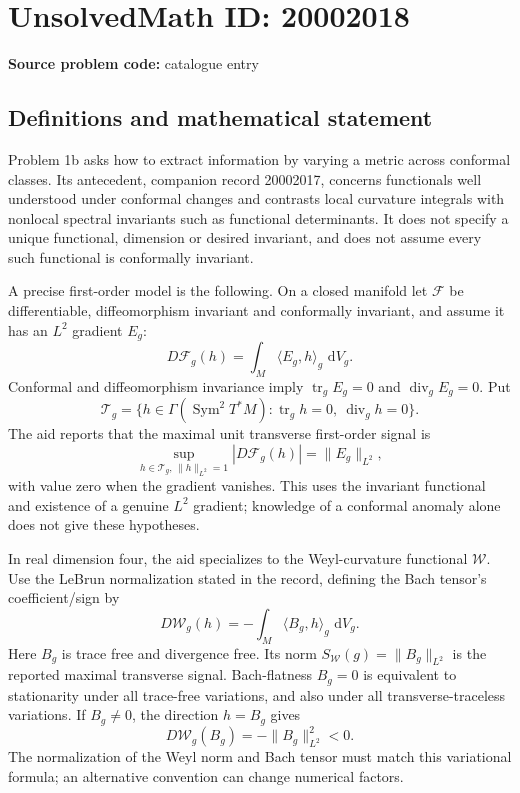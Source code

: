 \documentclass[11pt]{article}
\newcommand{\dd}{\,\mathrm{d}}
\begin{document}
\section*{UnsolvedMath ID: 20002018}
\textbf{Source problem code:} catalogue entry
\subsection{Definitions and mathematical statement}
Problem 1b asks how to extract information by varying a metric across conformal classes. Its antecedent, companion record 20002017, concerns functionals well understood under conformal changes and contrasts local curvature integrals with nonlocal spectral invariants such as functional determinants. It does not specify a unique functional, dimension or desired invariant, and does not assume every such functional is conformally invariant.

A precise first-order model is the following. On a closed manifold let \(\mathcal F\) be differentiable, diffeomorphism invariant and conformally invariant, and assume it has an \(L^2\) gradient \(E_g\):
\[
D\mathcal F_g(h)=\int_M\langle E_g,h\rangle_g\,\dd V_g.
\]
Conformal and diffeomorphism invariance imply \(\operatorname{tr}_gE_g=0\) and \(\operatorname{div}_gE_g=0\). Put
\[
\mathcal T_g=\{h\in\Gamma(\operatorname{Sym}^2T^*M):\operatorname{tr}_gh=0,\ \operatorname{div}_gh=0\}.
\]
The aid reports that the maximal unit transverse first-order signal is
\[
\sup_{h\in\mathcal T_g,\,\|h\|_{L^2}=1}|D\mathcal F_g(h)|=\|E_g\|_{L^2},
\]
with value zero when the gradient vanishes. This uses the invariant functional and existence of a genuine \(L^2\) gradient; knowledge of a conformal anomaly alone does not give these hypotheses.

In real dimension four, the aid specializes to the Weyl-curvature functional \(\mathcal W\). Use the LeBrun normalization stated in the record, defining the Bach tensor's coefficient/sign by
\[
D\mathcal W_g(h)=-\int_M\langle B_g,h\rangle_g\,\dd V_g.
\]
Here \(B_g\) is trace free and divergence free. Its norm \(S_{\mathcal W}(g)=\|B_g\|_{L^2}\) is the reported maximal transverse signal. Bach-flatness \(B_g=0\) is equivalent to stationarity under all trace-free variations, and also under all transverse-traceless variations. If \(B_g\ne0\), the direction \(h=B_g\) gives
\[
D\mathcal W_g(B_g)=-\|B_g\|_{L^2}^2<0.
\]
The normalization of the Weyl norm and Bach tensor must match this variational formula; an alternative convention can change numerical factors.
\end{document}
